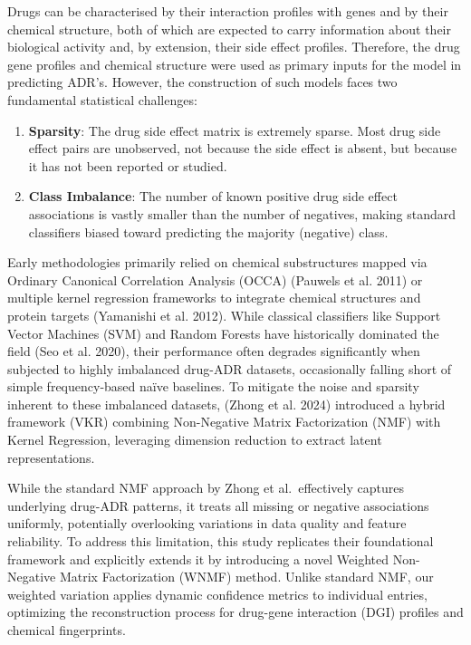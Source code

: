 \documentclass{article}
\begin{document}
Drugs can be characterised by their interaction profiles with genes and
by their chemical structure, both of which are expected to carry
information about their biological activity and, by extension, their
side effect profiles. Therefore, the drug gene profiles and chemical
structure were used as primary inputs for the model in predicting ADR's.
However, the construction of such models faces two fundamental
statistical challenges:

\begin{enumerate}
\def\labelenumi{\arabic{enumi}.}
\item
  \textbf{Sparsity}: The drug side effect matrix is extremely sparse.
  Most drug side effect pairs are unobserved, not because the side
  effect is absent, but because it has not been reported or studied.
\item
  \textbf{Class Imbalance}: The number of known positive drug side
  effect associations is vastly smaller than the number of negatives,
  making standard classifiers biased toward predicting the majority
  (negative) class.
\end{enumerate}

Early methodologies primarily relied on chemical substructures mapped
via Ordinary Canonical Correlation Analysis (OCCA) (Pauwels et al. 2011)
or multiple kernel regression frameworks to integrate chemical
structures and protein targets (Yamanishi et al. 2012). While classical
classifiers like Support Vector Machines (SVM) and Random Forests have
historically dominated the field (Seo et al. 2020), their performance
often degrades significantly when subjected to highly imbalanced
drug-ADR datasets, occasionally falling short of simple frequency-based
naïve baselines. To mitigate the noise and sparsity inherent to these
imbalanced datasets, (Zhong et al. 2024) introduced a hybrid framework
(VKR) combining Non-Negative Matrix Factorization (NMF) with Kernel
Regression, leveraging dimension reduction to extract latent
representations.

While the standard NMF approach by Zhong et al.~effectively captures
underlying drug-ADR patterns, it treats all missing or negative
associations uniformly, potentially overlooking variations in data
quality and feature reliability. To address this limitation, this study
replicates their foundational framework and explicitly extends it by
introducing a novel Weighted Non-Negative Matrix Factorization (WNMF)
method. Unlike standard NMF, our weighted variation applies dynamic
confidence metrics to individual entries, optimizing the reconstruction
process for drug-gene interaction (DGI) profiles and chemical
fingerprints.
\end{document}

